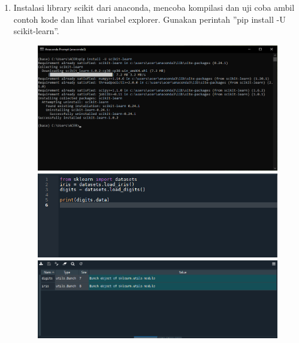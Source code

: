 \begin{enumerate}
\item
Instalasi library scikit dari anaconda, mencoba kompilasi dan uji coba ambil contoh kode dan lihat variabel explorer. Gunakan perintah ”pip install -U scikit-learn”.
	\begin{figure}[!htbp]
		\centering
		\includegraphics[scale=0.4]{figures/1.PNG}
		\includegraphics[scale=0.5]{figures/1a.PNG}
		\includegraphics[scale=0.4]{figures/1b.PNG}
	\end{figure}


\end{enumerate}
